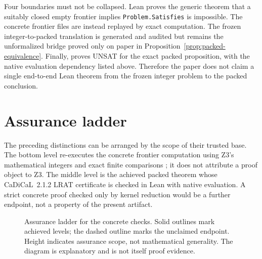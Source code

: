 \documentclass[11pt,twoside]{article}
\theoremstyle{remark}
\begin{document}
\begin{trustboundary}
Four boundaries must not be collapsed.  Lean proves the generic theorem that
a suitably closed empty frontier implies \texttt{Problem.Satisfies} is
impossible.  The concrete frontier files are instead replayed by exact
computation.  The frozen integer-to-packed translation is generated and
audited but remains the unformalized bridge proved only on paper in
Proposition~\ref{prop:packed-equivalence}.  Finally, \PackedTheorem{} proves
UNSAT for the exact packed proposition, with the native evaluation dependency
listed above.  Therefore the paper does not claim a single end-to-end Lean
theorem from the frozen integer problem to the packed conclusion.
\end{trustboundary}

\section{Assurance ladder}
\label{sec:assurance-ladder}

The preceding distinctions can be arranged by the scope of their trusted
base.  The bottom level re-executes the concrete frontier computation using
Z3's mathematical integers and exact finite comparisons
\cite{z3Arithmetic}; it does not attribute a proof object to Z3.  The middle
level is the achieved packed theorem whose CaDiCaL~2.1.2 LRAT certificate is
checked in Lean with native evaluation.  A strict concrete proof checked only by
kernel reduction would be a further endpoint, not a property of the present
artifact.

\begin{figure}[t]
  \centering
  \caption{Assurance ladder for the concrete checks.  Solid outlines mark
  achieved levels; the dashed outline marks the unclaimed endpoint.  Height
  indicates assurance scope, not mathematical generality.  The diagram is
  explanatory and is not itself proof evidence.}
  \label{fig:assurance-ladder}
\end{figure}
\end{document}
